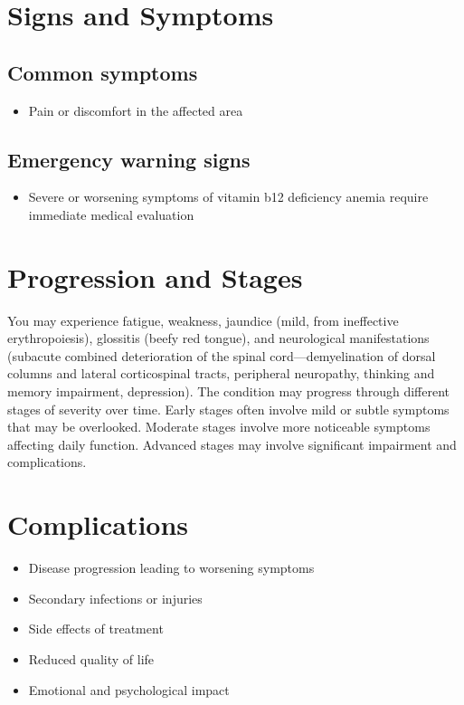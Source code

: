 \section{Signs and Symptoms}

\subsection{Common symptoms}
\begin{itemize}[noitemsep]
  \item Pain or discomfort in the affected area
  \end{itemize}

\subsection{Emergency warning signs}
\begin{itemize}[noitemsep]
  \item Severe or worsening symptoms of vitamin b12 deficiency anemia require immediate medical evaluation
\end{itemize}
\section{Progression and Stages}
You may experience fatigue, weakness, jaundice (mild, from ineffective erythropoiesis), glossitis (beefy red tongue), and neurological manifestations (subacute combined deterioration of the spinal cord---demyelination of dorsal columns and lateral corticospinal tracts, peripheral neuropathy, thinking and memory impairment, depression). The condition may progress through different stages of severity over time. Early stages often involve mild or subtle symptoms that may be overlooked. Moderate stages involve more noticeable symptoms affecting daily function. Advanced stages may involve significant impairment and complications.
\section{Complications}
\begin{itemize}[noitemsep]
  \item Disease progression leading to worsening symptoms
  \item Secondary infections or injuries
  \item Side effects of treatment
  \item Reduced quality of life
  \item Emotional and psychological impact
\end{itemize}
